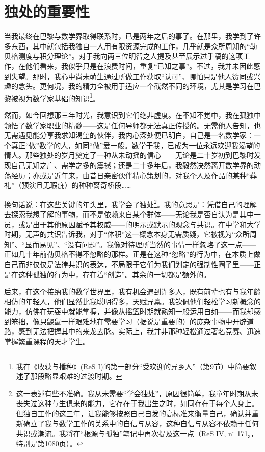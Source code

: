 
\section{独处的重要性}

当我最终在巴黎与数学界取得联系时，已是两年之后的事了。在那里，我学到了许多东西，其中就包括我独自一人用有限资源完成的工作，几乎就是众所周知的“勒贝格测度与积分理论”。对于我向两三位明智之人提及甚至展示过手稿的这项工作，在他们看来，我似乎只是在浪费时间，重复“已知之事”。不过，我并未因此感到失望。那时，我心中尚未萌生通过所做工作获取“认可”、哪怕只是他人赞同或兴趣的念头。更何况，我的精力全被用于适应一个截然不同的环境，尤其是学习在巴黎被视为数学家基础的知识\footnote{我在《收获与播种》(ReS I)的第一部分“受欢迎的异乡人”（第9节）中简要叙述了那段略显艰难的过渡时期。}。

然而，如今回想那三年时光，我意识到它们绝非虚度。在不知不觉中，我在孤独中领悟了数学家职业的精髓——这是任何导师都无法真正传授的。无需他人告知，也无需遇见能分享我求知渴望的伙伴，我内心深处便已明白，自己是一名数学家：一个真正“做”数学的人，如同“做”爱一般。数学于我，已成为一位永远欢迎我渴望的情人。那些独处的岁月奠定了一种从未动摇的信心——无论是二十岁初到巴黎时发现自己无知之广、需学之多的震撼；还是二十多年后，我毅然决然离开数学界的动荡经历；亦或是近年来，由昔日亲密伙伴精心策划的，对我个人及作品的某种“葬礼”（预演且无瑕疵）的种种离奇桥段……

换句话说：在这些关键的年头里，我学会了独处\footnote{这一表述有些不准确。我从未需要“学会独处”，原因很简单，我童年时期从未丧失过这种与生俱来的能力，它存在于我出生之时，如同存在于每个人身上。但独自工作的这三年，让我能够按照自己自发的高标准来衡量自己，确认并重新确立了我与数学工作的关系中的自信与从容，这种自信与从容不依赖于任何共识或潮流。我将在“根源与孤独”笔记中再次提及这一点（ReS IV, n$^{\circ}$ 171$_3$，特别是第1080页）。}。我的意思是：凭借自己的理解去探索我想了解的事物，而不是依赖来自某个群体——无论我是否自认为是其中一员，或是出于其他原因赋予其权威——的明示或默示的观念与共识。在中学和大学时期，无声的共识告诉我，对于“体积”这一概念本身无需质疑，它被视为“众所周知”、“显而易见”、“没有问题”。我像对待理所当然的事情一样忽略了这一点——正如几十年前勒贝格不得不忽略的那样。正是在这种“忽略”的行为中，在本质上做自己而非仅仅是法律共识的表达，不局限于它们为我们划定的强制性圈子里——正是在这种孤独的行为中，存在着“创造”。其余的一切都是额外的。

后来，在这个接纳我的数学世界里，我有机会遇到许多人，既有前辈也有与我年龄相仿的年轻人，他们显然比我聪明得多，天赋异禀。我钦佩他们轻松学习新概念的能力，仿佛在玩耍中就能掌握，并像从摇篮时期就熟知一般运用自如——而我却感到笨拙，像只鼹鼠一样艰难地在需要学习（据说是重要的）的庞杂事物中开辟道路，感到无法把握其中的来龙去脉。实际上，我并非那种轻松通过著名竞赛、迅速掌握繁重课程的天才学生。

